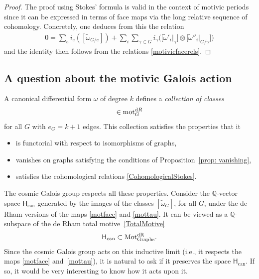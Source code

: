 \documentclass[pdftex]{sigma}%
\numberwithin{equation}{section}
\newcommand{\Q}{\mathbb Q}
\newcommand{\can}{\mathrm{can}}
\newcommand{\0}{\color{blue}{\mathsf{0}}}
\begin{document}
\begin{proof} The proof using Stokes' formula is valid in the context of motivic periods since it can be expressed in terms of face maps via the long relative sequence of cohomology.
Concretely, one deduces from this the relation
\begin{gather} \label{CohomologicalStokes}
0= \sum_e i_e([\widetilde{\omega}_{G/e}]) + \sum_i \sum_{\gamma \subset G} i_{\gamma}\big(\big[\widetilde{\omega}'_i\big|_{\gamma}\big] \otimes \big[\widetilde{\omega}''_i\big|_{G/\gamma}\big]\big) \end{gather}
and the identity then follows from the relations \eqref{motivicfacerels}.
\end{proof}


\subsection{A question about the motivic Galois action} \label{sect: QuestionGalois}
 A canonical differential form $\omega$ of degree $k$ defines a \emph{collection of classes}
\begin{gather*}
[\widetilde{\omega}_G] \in \mathrm{mot}^{{\rm d}R}_G
\end{gather*}
 for all $G$ with $e_G=k+1$ edges.
 This collection satisfies the properties that it
 \begin{itemize}\itemsep=0pt
 \item is functorial with respect to isomorphisms of graphs,
 \item vanishes on graphs satisfying the conditions of Proposition~\ref{prop: vanishing},
 \item satisfies the cohomological relations \eqref{CohomologicalStokes}.
 \end{itemize}
 The cosmic Galois group respects all these properties.
 Consider the $\Q$-vector space $\mathsf{H}_{\can}$ gene\-rated by the images of the classes
 $[\widetilde{\omega}_G]$, for all $G$, under the de Rham versions of the maps \eqref{motface} and \eqref{mottau}. It can be viewed
as a $\Q$-subspace of the de Rham total motive~\eqref{TotalMotive}
\begin{gather*}
 \mathsf{H}_{\can} \subset \mathrm{Mot^{{\rm d}R}_{Graphs}}.
 \end{gather*} Since the cosmic Galois group acts on this inductive limit (i.e., it respects the maps \eqref{motface} and~\eqref{mottau}),
it is natural to ask if it preserves the space $\mathsf{H}_{\can}$. If so, it would be very interesting to know how it acts upon it.
\end{document}
